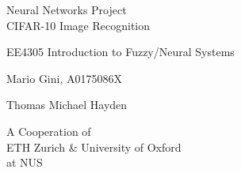     \begin{titlepage}

    \begin{center}
    \vspace*{6cm}
    \centering
    \Huge
    { 
    	Neural Networks Project\\
    	CIFAR-10 Image Recognition }
    \vspace{2cm}

    \Huge
    {EE4305 Introduction to Fuzzy/Neural Systems}
    \vspace{0.5cm}
    
    \Large
    {Mario Gini, A0175086X 
    	
    Thomas Michael Hayden\\
	}
	\vspace{1cm}
	\Large
	{
		A Cooperation of\\
		ETH Zurich \& University of Oxford\\
		at NUS}
   
    \end{center}
    \end{titlepage}